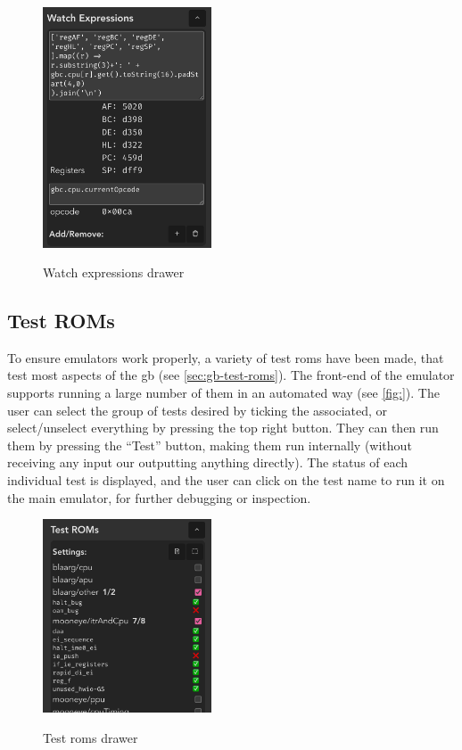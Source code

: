 \documentclass[11pt]{informatics-report}
\begin{document}
\begin{figure}[h]
    \centering
    \includegraphics[width=5cm]{images/watch-expressions}\\
    \caption{Watch expressions drawer}
    \label{fig:watch-expressions}
\end{figure}

\subsection{Test ROMs}
\label{sec:testing-ui}

To ensure emulators work properly, a variety of test \glspl{rom} have been made, that test most aspects of the \gls{gb} (see \ref{sec:gb-test-roms}). The front-end of the emulator supports running a large number of them in an automated way (see \ref{fig:}). The user can select the group of tests desired by ticking the associated, or select/unselect everything by pressing the top right button. They can then run them by pressing the ``Test'' button, making them run internally (without receiving any input our outputting anything directly). The status of each individual test is displayed, and the user can click on the test name to run it on the main emulator, for further debugging or inspection.

\begin{figure}[h]
    \centering
    \includegraphics[width=5cm]{images/test-roms}\\
    \caption{Test \glspl{rom} drawer}
    \label{fig:watch-expressions}
\end{figure}
\end{document}

